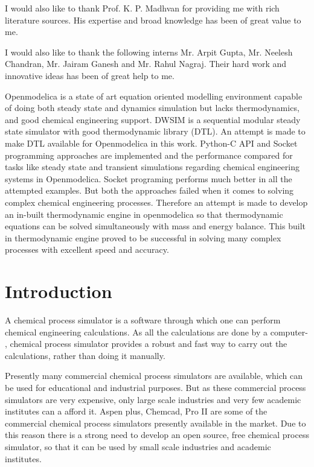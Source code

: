 \documentclass[12pt]{report}
\begin{document}
I would also like to thank Prof. K. P. Madhvan for providing me with rich literature sources. His expertise and broad knowledge has been of great value to me.  

I would also like to thank the following interns Mr. Arpit Gupta, Mr. Neelesh Chandran, Mr. Jairam Ganesh and Mr. Rahul Nagraj. Their hard work and innovative ideas has been of great help to me. 


\abstract
Openmodelica is a state of art equation oriented modelling environment capable of doing both steady state and dynamics simulation but lacks thermodynamics, and good chemical engineering support. DWSIM is a sequential modular steady state simulator with good thermodynamic library (DTL). An attempt is made to make DTL available for Openmodelica in this work. Python-C API and Socket programming approaches are implemented and the performance compared for tasks like steady state and transient simulations regarding chemical engineering systems in Openmodelica. Socket programing performs much better in all the attempted examples. But both the approaches failed when it comes to solving complex chemical engineering processes. Therefore an attempt is made to develop an in-built thermodynamic engine in openmodelica so that thermodynamic equations can be solved simultaneously with mass and energy balance. This built in thermodynamic engine proved to be successful in solving many complex processes with excellent speed and accuracy. 
\tableofcontents
\listoftables
\listoffigures

\chapter{Introduction}
A chemical process simulator is a software through which one can perform chemical engineering calculations. As all the calculations are done by a computer-  , chemical process simulator provides a robust and fast way to carry out the calculations, rather than doing it manually.

Presently many commercial chemical process simulators are available, which can be used for educational and industrial purposes. But as these commercial process simulators are very expensive, only large scale industries and very few academic institutes can a afford it. Aspen plus, Chemcad, Pro II are some of the commercial chemical process simulators presently available in the market. Due to this reason there is a strong need to develop an open source, free chemical process simulator, so that it can be used by small scale industries and academic institutes.
\end{document}
